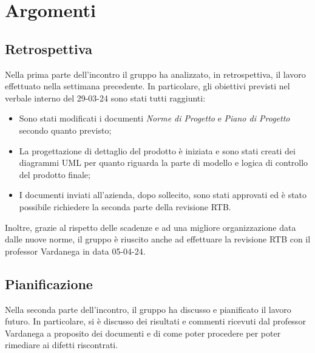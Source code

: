 \section{Argomenti}
\subsection{Retrospettiva}
Nella prima parte dell'incontro il gruppo ha analizzato, in retrospettiva, il lavoro effettuato nella settimana precedente.
In particolare, gli obiettivi previsti nel verbale interno del 29-03-24 sono stati tutti raggiunti:
\begin{itemize}
    \item Sono stati modificati i documenti \textit{Norme di Progetto} e \textit{Piano di Progetto} secondo quanto previsto;
    \item La progettazione di dettaglio del prodotto è iniziata e sono stati creati dei diagrammi UML per quanto riguarda la parte di modello e logica di controllo del prodotto finale;
    \item  I documenti inviati all'azienda, dopo sollecito, sono stati approvati ed è stato possibile richiedere la seconda parte della revisione RTB.
\end{itemize}
Inoltre, grazie al rispetto delle scadenze e ad una migliore organizzazione data dalle nuove norme, il gruppo è riuscito anche ad effettuare la revisione RTB con il professor Vardanega in data 05-04-24. 


\subsection{Pianificazione}
\noindent Nella seconda parte dell'incontro, il gruppo ha discusso e pianificato il lavoro futuro. In particolare, si è discusso dei risultati e commenti ricevuti dal professor Vardanega a proposito dei documenti e di come poter procedere per poter rimediare ai difetti riscontrati.
\bigskip

